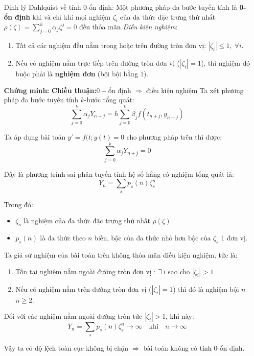 \begin{baitapbox}{Định lý Dahlquist về tính 0-ổn định:} 
    Một phương pháp đa bước tuyến tính là \textbf{0-ổn định} khi và chỉ khi mọi nghiệm $\zeta_i$ của đa thức đặc trưng thứ nhất $\rho(\zeta) = \sum_{j=0}^k \alpha_j \zeta^j = 0$ đều thỏa mãn \textit{Điều kiện nghiệm}:
    \begin{enumerate}
        \item Tất cả các nghiệm đều nằm trong hoặc trên đường tròn đơn vị: $|\zeta_i| \le 1, \;\forall i$.
        \item Nếu có nghiệm nằm trực tiếp trên đường tròn đơn vị ($|\zeta_i| = 1$), thì nghiệm đó buộc phải là \textbf{nghiệm đơn} (bội bội bằng $1$).
    \end{enumerate}
\end{baitapbox}
\noindent \textbf{Chứng minh:}
\noindent\textbf{Chiều thuận:}$0-$ổn định $\Rightarrow$ điều kiện nghiệm
Ta xét phương pháp đa bước tuyến tính $k$-bước tổng quát:
\[
\sum_{j=0}^{k} \alpha_j Y_{n+j} = h \sum_{j=0}^{k} \beta_j f(t_{n+j}, y_{n+j})
\]

Ta áp dụng bài toán $y'=f(t;y(t) = 0$ cho phương pháp trên thì được:
\[
\sum_{j=0}^{k} \alpha_j Y_{n+j} = 0
\]

Đây là phương trình sai phân tuyến tính hệ số hằng có nghiệm tổng quát là:
\[
Y_n = \sum_{s} p_s(n) \zeta_s^n
\]

Trong đó: 
\begin{itemize}[label = \null]
    \item $\zeta_s$ là nghiệm của đa thức đặc trưng thứ nhất $\rho(\zeta)$.
    \item $p_s(n)$ là đa thức theo $n$ biến, bậc của đa thức nhỏ hơn bậc của $\zeta_s$ 1 đơn vị.
\end{itemize}
Ta giả sử nghiệm của bài toán trên không thỏa mãn điều kiện nghiệm, tức là:
\begin{enumerate}
    \item Tồn tại nghiệm nằm ngoài đường tròn đơn vị : $ \exists \ i$ sao cho $|\zeta_i| > 1  $
    \item Nếu có nghiệm nằm trên đường tròn đơn vị ($|\zeta_i| = 1  $) thì đó là nghiệm bội $n$ \quad $n \ge 2$.
\end{enumerate}

Đối với các nghiệm nằm ngoài đường tròn tức $|\zeta_i| > 1$, khi này:
\[Y_n = \sum_{s} p_s(n) \zeta_s^n \to \infty \quad  \text{khi} \quad n \to \infty\]

Vậy ta có độ lệch toàn cục không bị chặn $\Rightarrow$ bài toán không có tính $0$-ổn định.

